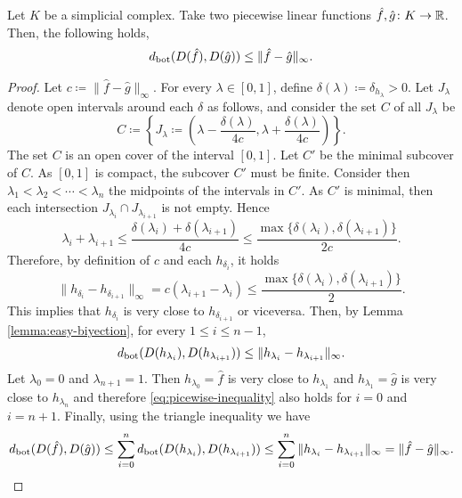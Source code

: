 \begin{lemma} \label{lemma:interpolation}
    Let $ K $ be a simplicial complex. Take two piecewise linear functions $ \hat f, \hat g \colon K \to \mathbb R $. Then, the following holds,
    \begin{align}
        d_{\operatorname{bot}}(D(\hat f), D(\hat g)) \leq \|\hat f - \hat g \|_\infty.
    \end{align}
\end{lemma}
\begin{proof}
    Let $ c \coloneq \| \hat f - \hat g \|_\infty $. For every $ \lambda \in [0, 1] $, define $ \delta(\lambda) \coloneq \delta_{h_\lambda} > 0 $. Let $ J_\lambda $ denote open intervals around each $ \delta $ as follows, and consider the set $ C $ of all $ J_\lambda $ be
    $$
        C \coloneq \left\{J_\lambda \coloneq\left( \lambda - \frac{\delta(\lambda)}{4c}, \lambda + \frac{\delta(\lambda)}{4c}\right)\right\}.
    $$
    The set $ C $ is an open cover of the interval $ [0, 1] $. Let $ C'$ be the minimal subcover of $ C $. As $ [0, 1] $ is compact, the subcover $ C' $ must be finite. Consider then $ \lambda_1 < \lambda_2 < \cdots < \lambda_n $ the midpoints of the intervals in $ C' $. As $ C' $ is minimal, then each intersection $ J_{\lambda_i} \cap J_{\lambda_{i+1}} $ is not empty. Hence
    $$
        \lambda_i + \lambda_{i+1} \leq \frac{\delta(\lambda_i) + \delta(\lambda_{i+1})}{4c} \leq \frac{\max\{\delta(\lambda_i), \delta(\lambda_{i+1})\}}{2c}.
    $$
    Therefore, by definition of $ c $ and each $ h_{\delta_i} $, it holds
    $$
        \|h_{\delta_i} - h_{\delta_{i+1}} \|_\infty = c(\lambda_{i+1} - \lambda_i) \leq \frac{\max\{\delta(\lambda_i), \delta(\lambda_{i+1})\}}{2}.
    $$
    This implies that $ h_{\delta_i} $ is very close to $ h_{\delta_{i+1}} $ or viceversa. Then, by Lemma \ref{lemma:easy-biyection}, for every $ 1 \leq i \leq n-1 $,
    \begin{align} \label{eq:picewise-inequality}
        d_{\operatorname{bot}}(D(h_{\lambda_i}), D(h_{\lambda_{i+1}})) \leq \| h_{\lambda_i} - h_{\lambda_{i+1}} \|_\infty.
    \end{align}
    Let $ \lambda_0 = 0 $ and $ \lambda_{n+1} = 1 $. Then $ h_{\lambda_0} = \hat f $ is very close to $ h_{\lambda_1} $ and $ h_{\lambda_1} = \hat g $ is very close to $ h_{\lambda_n} $ and therefore \eqref{eq:picewise-inequality} also holds for $ i = 0 $ and $ i = n+1 $. Finally, using the triangle inequality we have
    $$
        d_{\operatorname{bot}}(D(\hat f), D(\hat g)) \leq \sum_{i=0}^{n} d_{\operatorname{bot}}(D(h_{\lambda_i}), D(h_{\lambda_{i+1}})) \leq \sum_{i=0}^{n} \| h_{\lambda_i} - h_{\lambda_{i+1}} \|_\infty = \|\hat f - \hat g \|_\infty.
    $$
\end{proof}

